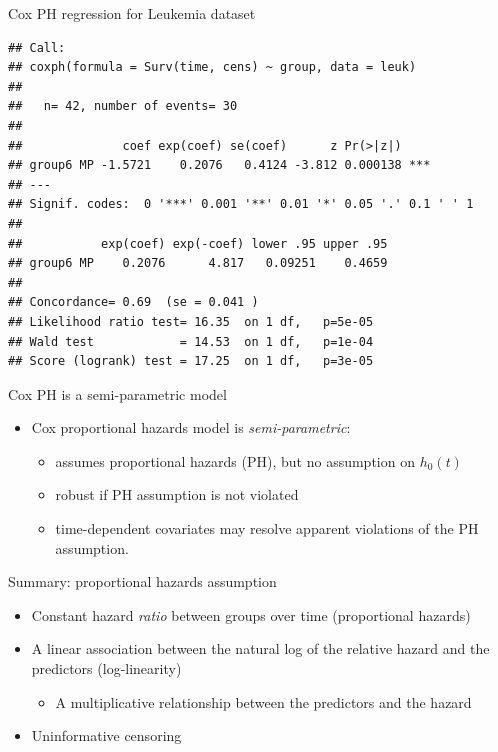 \documentclass[
  ignorenonframetext,
]{beamer}
\providecommand{\tightlist}{%
  \setlength{\itemsep}{0pt}\setlength{\parskip}{0pt}}
\begin{document}
\begin{frame}[fragile]{Cox PH regression for Leukemia dataset}
\protect\hypertarget{cox-ph-regression-for-leukemia-dataset}{}

\tiny

\begin{verbatim}
## Call:
## coxph(formula = Surv(time, cens) ~ group, data = leuk)
## 
##   n= 42, number of events= 30 
## 
##              coef exp(coef) se(coef)      z Pr(>|z|)    
## group6 MP -1.5721    0.2076   0.4124 -3.812 0.000138 ***
## ---
## Signif. codes:  0 '***' 0.001 '**' 0.01 '*' 0.05 '.' 0.1 ' ' 1
## 
##           exp(coef) exp(-coef) lower .95 upper .95
## group6 MP    0.2076      4.817   0.09251    0.4659
## 
## Concordance= 0.69  (se = 0.041 )
## Likelihood ratio test= 16.35  on 1 df,   p=5e-05
## Wald test            = 14.53  on 1 df,   p=1e-04
## Score (logrank) test = 17.25  on 1 df,   p=3e-05
\end{verbatim}

\end{frame}

\begin{frame}{Cox PH is a semi-parametric model}
\protect\hypertarget{cox-ph-is-a-semi-parametric-model}{}

\begin{itemize}
\tightlist
\item
  Cox proportional hazards model is \emph{semi-parametric}:

  \begin{itemize}
  \tightlist
  \item
    assumes proportional hazards (PH), but no assumption on \(h_0(t)\)
  \item
    robust if PH assumption is not violated
  \item
    time-dependent covariates may resolve apparent violations of the PH
    assumption.
  \end{itemize}
\end{itemize}

\end{frame}

\begin{frame}{Summary: proportional hazards assumption}
\protect\hypertarget{summary-proportional-hazards-assumption}{}

\begin{itemize}
\tightlist
\item
  Constant hazard \emph{ratio} between groups over time (proportional
  hazards)
\item
  A linear association between the natural log of the relative hazard
  and the predictors (log-linearity)

  \begin{itemize}
  \tightlist
  \item
    A multiplicative relationship between the predictors and the hazard
  \end{itemize}
\item
  Uninformative censoring
\end{itemize}

\end{frame}
\end{document}
